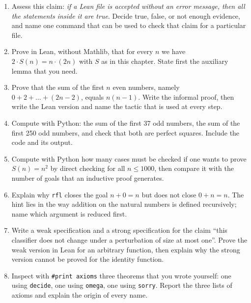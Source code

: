 \begin{latihan}
\begin{enumerate}
  \item Assess this claim: \emph{if a Lean file is accepted without an error message, then all the
        statements inside it are true}. Decide true, false, or not enough evidence, and name one
        command that can be used to check that claim for a particular file.

  \item Prove in Lean, without Mathlib, that for every $n$ we have $2\cdot S(n)=n\cdot(2n)$ with $S$
        as in this chapter. State first the auxiliary lemma that you need.

  \item Prove that the sum of the first $n$ even numbers, namely $0+2+\dots+(2n-2)$, equals
        $n(n-1)$. Write the informal proof, then write the Lean version and name the tactic that is
        used at every step.

  \item Compute with Python: the sum of the first 37 odd numbers, the sum of the first 250 odd
        numbers, and check that both are perfect squares. Include the code and its output.

  \item Compute with Python how many cases must be checked if one wants to prove $S(n)=n^{2}$ by
        direct checking for all $n\le 1000$, then compare it with the number of goals that an
        inductive proof generates.

  \item Explain why \texttt{rfl} closes the goal $n+0=n$ but does not close $0+n=n$. The hint lies
        in the way addition on the natural numbers is defined recursively; name which argument is
        reduced first.

  \item Write a weak specification and a strong specification for the claim ``this classifier does
        not change under a perturbation of size at most one''. Prove the weak version in Lean for an
        arbitrary function, then explain why the strong version cannot be proved for the identity
        function.

  \item Inspect with \texttt{\#print axioms} three theorems that you wrote yourself: one using
        \texttt{decide}, one using \texttt{omega}, one using \texttt{sorry}. Report the three lists
        of axioms and explain the origin of every name.


\end{enumerate}
\end{latihan}
